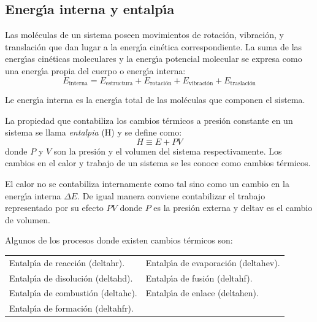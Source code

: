 \subsection{Energ\'{\i}a interna y entalp\'{\i}a}

Las mol\'eculas de un sistema poseen movimientos de rotaci\'on, vibraci\'on,
y translaci\'on que dan lugar a la energ\'{\i}a cin\'etica correspondiente.
La suma de las energ\'{\i}as cin\'eticas moleculares y la energ\'{\i}a
potencial molecular se expresa como una energ\'{\i}a propia del cuerpo o energ\'{\i}a interna:
\begin{equation}
E_\textrm{interna}=E_\textrm{estructura}+E_\textrm{rotaci\'on}+E_\textrm{vibraci\'on}+E_\textrm{traslaci\'on}
\end{equation}

Le energ\'{\i}a interna es la energ\'{\i}a total de las mol\'eculas que componen el sistema.

 La propiedad que contabiliza los cambios t\'ermicos a presi\'on constante en un sistema se
llama \textit{\gls{entalpia}} (\gls{H})  y se define
como:
\begin{equation}
H \equiv  E + PV
\end{equation}
donde $P$ y $V$ son la presi\'on y el volumen del sistema respectivamente. Los cambios en el calor y trabajo de un sistema se les conoce como cambios t\'er\-mi\-cos.


El calor no se contabiliza internamente como tal sino como un cambio en la energ\'{\i}a interna $\Delta E$. De igual manera conviene contabilizar el trabajo representado por su efecto $PV$ donde $P$ es la presi\'on externa y  \gls{deltav} es el cambio de volumen.

Algunos de los procesos donde existen cambios t\'ermicos son:

\begin{center}
\begin{tabular}{ll}
Entalp\'{\i}a de reacci\'on (\gls{deltahr}).  & Entalp\'{\i}a de evaporaci\'on (\gls{deltahev}).\\
Entalp\'{\i}a de disoluci\'on (\gls{deltahd}). &Entalp\'{\i}a de fusi\'on (\gls{deltahf}). \\
Entalp\'{\i}a de combusti\'on (\gls{deltahc}). &  Entalp\'{\i}a de enlace (\gls{deltahen}).\\
Entalp\'{\i}a de formaci\'on (\gls{deltahfr}). &
\end{tabular}
\end{center}


